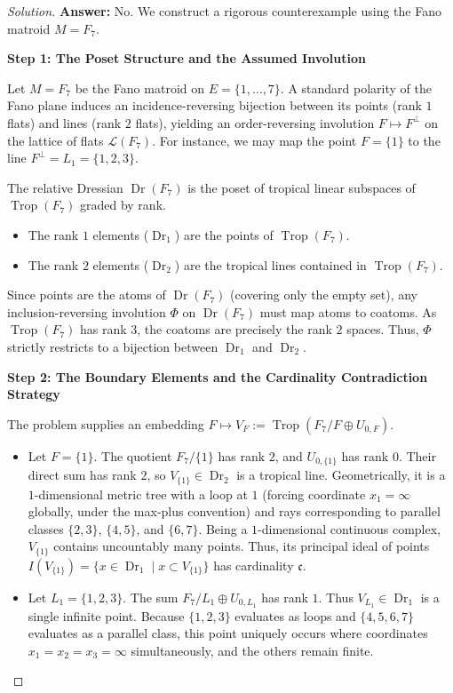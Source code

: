 \documentclass[12pt]{article}
\DeclareMathOperator{\Trop}{Trop}
\DeclareMathOperator{\Dr}{Dr}
\newcommand{\cLL}{\mathcal{L}}
\begin{document}
\begin{proof}[Solution]
\textbf{Answer:} No. We construct a rigorous counterexample using the Fano matroid $M = F_7$.

\medskip
\noindent \textbf{Step 1: The Poset Structure and the Assumed Involution}

Let $M = F_7$ be the Fano matroid on $E = \{1, \dots, 7\}$. A standard polarity of the Fano plane induces an incidence-reversing bijection between its points (rank $1$ flats) and lines (rank $2$ flats), yielding an order-reversing involution $F \mapsto F^\perp$ on the lattice of flats $\cLL(F_7)$. For instance, we may map the point $F = \{1\}$ to the line $F^\perp = L_1 = \{1,2,3\}$.

The relative Dressian $\Dr(F_7)$ is the poset of tropical linear subspaces of $\Trop(F_7)$ graded by rank. 
\begin{itemize}
    \item The rank $1$ elements ($\Dr_1$) are the points of $\Trop(F_7)$.
    \item The rank $2$ elements ($\Dr_2$) are the tropical lines contained in $\Trop(F_7)$.
\end{itemize}
Since points are the atoms of $\Dr(F_7)$ (covering only the empty set), any inclusion-reversing involution $\Phi$ on $\Dr(F_7)$ must map atoms to coatoms. As $\Trop(F_7)$ has rank $3$, the coatoms are precisely the rank $2$ spaces. Thus, $\Phi$ strictly restricts to a bijection between $\Dr_1$ and $\Dr_2$.

\medskip
\noindent \textbf{Step 2: The Boundary Elements and the Cardinality Contradiction Strategy}

The problem supplies an embedding $F \mapsto V_F := \Trop(F_7/F \oplus U_{0,F})$.
\begin{itemize}
    \item Let $F = \{1\}$. The quotient $F_7/\{1\}$ has rank $2$, and $U_{0,\{1\}}$ has rank $0$. Their direct sum has rank $2$, so $V_{\{1\}} \in \Dr_2$ is a tropical line. Geometrically, it is a $1$-dimensional metric tree with a loop at $1$ (forcing coordinate $x_1 = \infty$ globally, under the max-plus convention) and rays corresponding to parallel classes $\{2,3\}$, $\{4,5\}$, and $\{6,7\}$. Being a $1$-dimensional continuous complex, $V_{\{1\}}$ contains uncountably many points. Thus, its principal ideal of points $I(V_{\{1\}}) = \{ x \in \Dr_1 \mid x \subset V_{\{1\}} \}$ has cardinality $\mathfrak{c}$.
    \item Let $L_1 = \{1,2,3\}$. The sum $F_7/L_1 \oplus U_{0,L_1}$ has rank $1$. Thus $V_{L_1} \in \Dr_1$ is a single infinite point. Because $\{1,2,3\}$ evaluates as loops and $\{4,5,6,7\}$ evaluates as a parallel class, this point uniquely occurs where coordinates $x_1 = x_2 = x_3 = \infty$ simultaneously, and the others remain finite.
\end{itemize}


\end{proof}
\end{document}
